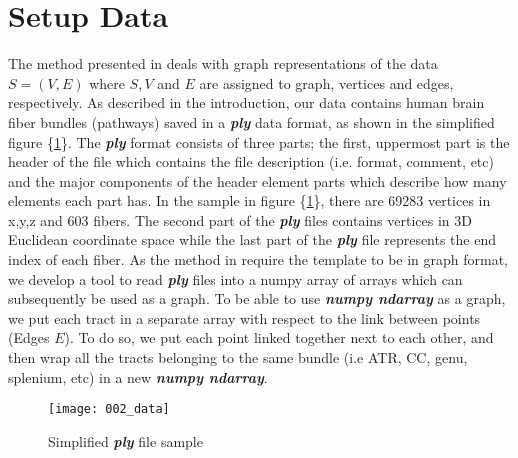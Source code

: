 \documentclass[../structure.tex]{subfiles}
\begin{document}
\section{Setup Data}
The method presented in \cite{Amberg2007} deals with graph representations of the data $S=(V,E)$ where $S,V$ and $E$ are assigned to graph, vertices and edges, respectively. As described in the introduction, our data contains human brain fiber bundles (pathways) saved in a \textbf{\textit{ply}} data format, as shown in the simplified figure \{\ref{fig:data}\}. The \textbf{\textit{ply}} format consists of three parts; the first, uppermost part is the header of the file which contains the file description (i.e. format, comment, etc) and the major components of the header element parts which describe how many elements each part has. In the sample in figure \{\ref{fig:data}\}, there are 69283 vertices in x,y,z and 603 fibers. The second part of the \textbf{\textit{ply}} files contains vertices in 3D Euclidean coordinate space while the last part of the \textbf{\textit{ply}} file represents the end index of each fiber. As the method in \cite{Amberg2007} require the template to be in graph format, we develop a tool to read \textbf{\textit{ply}} files into a numpy array of arrays which can subsequently be used as a graph. To be able to use \textbf{\textit{numpy ndarray}} as a graph, we put each tract in a separate array with respect to the link between points (Edges $E$). To do so, we put each point linked together next to each other, and then wrap all the tracts belonging to the same bundle (i.e ATR, CC, genu, splenium, etc) in a new \textbf{\textit{numpy ndarray}}.

\begin{figure}[h!]
\centering
\texttt{[image: 002\_data]}
\captionsetup{justification=centering}
\caption{Simplified \textbf{\textit{ply}} file sample}
\label{fig:data}
\end{figure}
\end{document}
